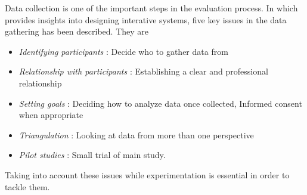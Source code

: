 {	Data collection is one of the important steps in the evaluation process. In \cite{Rogers2011} which provides insights into designing interative systems, five key issues in the data gathering has been described. They are 
\begin{itemize}
\item \emph{Identifying participants} : Decide who to gather data from
\item \emph{Relationship with participants} : Establishing a clear and professional relationship
\item \emph{Setting goals} : Deciding how to analyze data once collected, Informed consent when appropriate
\item \emph{Triangulation} : Looking at data from more than one perspective
\item \emph{Pilot studies} : Small trial of main study. 
\end{itemize}
Taking into account these issues while experimentation is essential in order to tackle them. 

}
